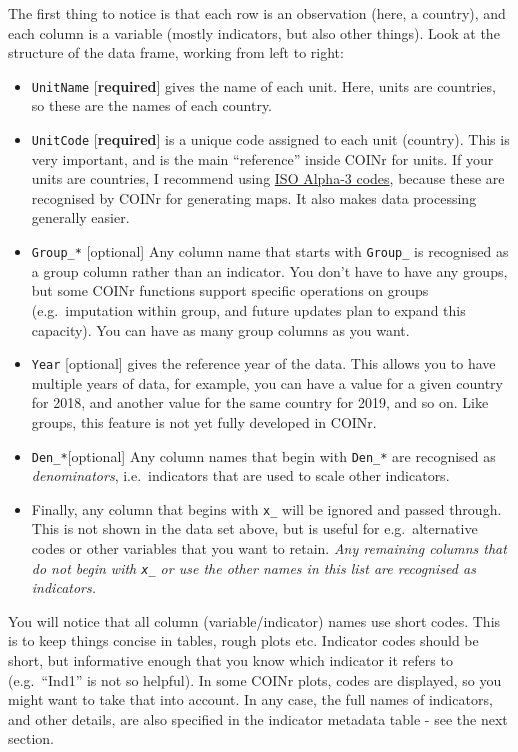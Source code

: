\documentclass[
]{book}
\providecommand{\tightlist}{%
  \setlength{\itemsep}{0pt}\setlength{\parskip}{0pt}}
\begin{document}
The first thing to notice is that each row is an observation (here, a country), and each column is a variable (mostly indicators, but also other things). Look at the structure of the data frame, working from left to right:

\begin{itemize}
\tightlist
\item
  \texttt{UnitName} {[}\textbf{required}{]} gives the name of each unit. Here, units are countries, so these are the names of each country.
\item
  \texttt{UnitCode} {[}\textbf{required}{]} is a unique code assigned to each unit (country). This is very important, and is the main ``reference'' inside COINr for units. If your units are countries, I recommend using \href{https://en.wikipedia.org/wiki/ISO_3166-1_alpha-3}{ISO Alpha-3 codes}, because these are recognised by COINr for generating maps. It also makes data processing generally easier.
\item
  \texttt{Group\_*} {[}optional{]} Any column name that starts with \texttt{Group\_} is recognised as a group column rather than an indicator. You don't have to have any groups, but some COINr functions support specific operations on groups (e.g.~imputation within group, and future updates plan to expand this capacity). You can have as many group columns as you want.
\item
  \texttt{Year} {[}optional{]} gives the reference year of the data. This allows you to have multiple years of data, for example, you can have a value for a given country for 2018, and another value for the same country for 2019, and so on. Like groups, this feature is not yet fully developed in COINr.
\item
  \texttt{Den\_*}{[}optional{]} Any column names that begin with \texttt{Den\_*} are recognised as \emph{denominators}, i.e.~indicators that are used to scale other indicators.
\item
  Finally, any column that begins with \texttt{x\_} will be ignored and passed through. This is not shown in the data set above, but is useful for e.g.~alternative codes or other variables that you want to retain. \emph{Any remaining columns that do not begin with \texttt{x\_} or use the other names in this list are recognised as indicators.}
\end{itemize}

You will notice that all column (variable/indicator) names use short codes. This is to keep things concise in tables, rough plots etc. Indicator codes should be short, but informative enough that you know which indicator it refers to (e.g.~``Ind1'' is not so helpful). In some COINr plots, codes are displayed, so you might want to take that into account. In any case, the full names of indicators, and other details, are also specified in the indicator metadata table - see the next section.
\end{document}

